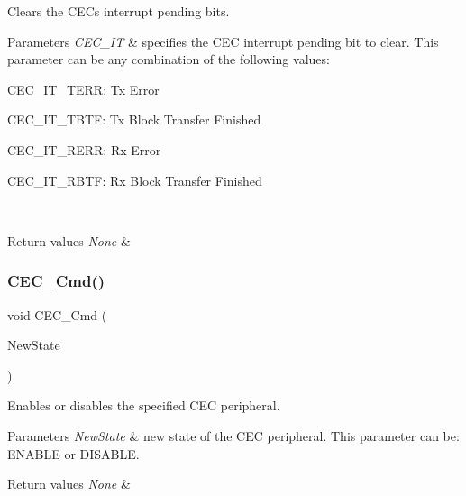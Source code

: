 Clears the C\+EC\textquotesingle{}s interrupt pending bits. 


\begin{DoxyParams}{Parameters}
{\em C\+E\+C\+\_\+\+IT} & specifies the C\+EC interrupt pending bit to clear. This parameter can be any combination of the following values\+: \begin{DoxyItemize}
\item C\+E\+C\+\_\+\+I\+T\+\_\+\+T\+E\+RR\+: Tx Error \item C\+E\+C\+\_\+\+I\+T\+\_\+\+T\+B\+TF\+: Tx Block Transfer Finished \item C\+E\+C\+\_\+\+I\+T\+\_\+\+R\+E\+RR\+: Rx Error \item C\+E\+C\+\_\+\+I\+T\+\_\+\+R\+B\+TF\+: Rx Block Transfer Finished \end{DoxyItemize}
\\
\hline
\end{DoxyParams}

\begin{DoxyRetVals}{Return values}
{\em None} & \\
\hline
\end{DoxyRetVals}
\mbox{\label{group___c_e_c___exported___functions_ga0c8efa79e5768930e567b3b3ed6e09e9}} 
\subsubsection{\texorpdfstring{CEC\_Cmd()}{CEC\_Cmd()}}
{\footnotesize\ttfamily void C\+E\+C\+\_\+\+Cmd (\begin{DoxyParamCaption}\item[{\mbox{\hyperlink{group___exported__types_gac9a7e9a35d2513ec15c3b537aaa4fba1}{Functional\+State}}}]{New\+State }\end{DoxyParamCaption})}



Enables or disables the specified C\+EC peripheral. 


\begin{DoxyParams}{Parameters}
{\em New\+State} & new state of the C\+EC peripheral. This parameter can be\+: E\+N\+A\+B\+LE or D\+I\+S\+A\+B\+LE. \\
\hline
\end{DoxyParams}

\begin{DoxyRetVals}{Return values}
{\em None} & \\
\hline
\end{DoxyRetVals}
\mbox{\label{group___c_e_c___exported___functions_ga604c3b15b51a46303c201fa3deac2212}} 
